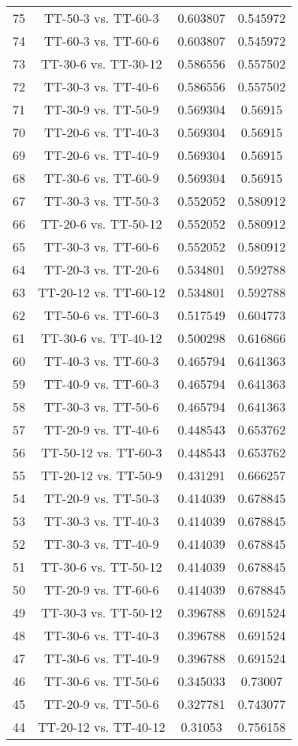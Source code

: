 \documentclass[a4paper,10pt]{article}
\begin{document}
\begin{landscape}
\begin{table}[!htp]
\begin{tabular}{cccc}
75&TT-50-3 vs. TT-60-3&0.603807&0.545972\\
74&TT-60-3 vs. TT-60-6&0.603807&0.545972\\
73&TT-30-6 vs. TT-30-12&0.586556&0.557502\\
72&TT-30-3 vs. TT-40-6&0.586556&0.557502\\
71&TT-30-9 vs. TT-50-9&0.569304&0.56915\\
70&TT-20-6 vs. TT-40-3&0.569304&0.56915\\
69&TT-20-6 vs. TT-40-9&0.569304&0.56915\\
68&TT-30-6 vs. TT-60-9&0.569304&0.56915\\
67&TT-30-3 vs. TT-50-3&0.552052&0.580912\\
66&TT-20-6 vs. TT-50-12&0.552052&0.580912\\
65&TT-30-3 vs. TT-60-6&0.552052&0.580912\\
64&TT-20-3 vs. TT-20-6&0.534801&0.592788\\
63&TT-20-12 vs. TT-60-12&0.534801&0.592788\\
62&TT-50-6 vs. TT-60-3&0.517549&0.604773\\
61&TT-30-6 vs. TT-40-12&0.500298&0.616866\\
60&TT-40-3 vs. TT-60-3&0.465794&0.641363\\
59&TT-40-9 vs. TT-60-3&0.465794&0.641363\\
58&TT-30-3 vs. TT-50-6&0.465794&0.641363\\
57&TT-20-9 vs. TT-40-6&0.448543&0.653762\\
56&TT-50-12 vs. TT-60-3&0.448543&0.653762\\
55&TT-20-12 vs. TT-50-9&0.431291&0.666257\\
54&TT-20-9 vs. TT-50-3&0.414039&0.678845\\
53&TT-30-3 vs. TT-40-3&0.414039&0.678845\\
52&TT-30-3 vs. TT-40-9&0.414039&0.678845\\
51&TT-30-6 vs. TT-50-12&0.414039&0.678845\\
50&TT-20-9 vs. TT-60-6&0.414039&0.678845\\
49&TT-30-3 vs. TT-50-12&0.396788&0.691524\\
48&TT-30-6 vs. TT-40-3&0.396788&0.691524\\
47&TT-30-6 vs. TT-40-9&0.396788&0.691524\\
46&TT-30-6 vs. TT-50-6&0.345033&0.73007\\
45&TT-20-9 vs. TT-50-6&0.327781&0.743077\\
44&TT-20-12 vs. TT-40-12&0.31053&0.756158\\

\end{tabular}
\end{table}
\end{landscape}
\end{document}
